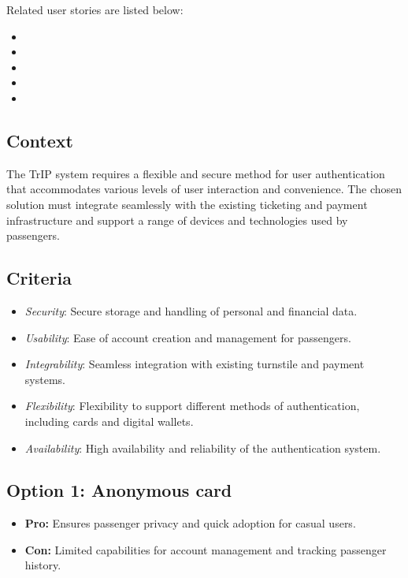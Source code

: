 Related user stories are listed below:
\begin{itemize}[noitemsep]
    \item \userStoryOne
    \item \userStoryFour
    \item \userStoryTwelve
    \item \userStoryEighteen
    \item \userStoryTwentySix
\end{itemize}

\subsection*{Context}
The TrIP system requires a flexible and secure method for user authentication that accommodates various levels of user interaction and convenience. The chosen solution must integrate seamlessly with the existing ticketing and payment infrastructure and support a range of devices and technologies used by passengers.

\subsection*{Criteria}
\begin{itemize}[noitemsep]
    \item \textit{Security}: Secure storage and handling of personal and financial data.
    \item \textit{Usability}: Ease of account creation and management for passengers.
    \item \textit{Integrability}: Seamless integration with existing turnstile and payment systems.
    \item \textit{Flexibility}: Flexibility to support different methods of authentication, including cards and digital wallets.
    \item \textit{Availability}: High availability and reliability of the authentication system.
\end{itemize}

\subsection*{Option 1: Anonymous card}
\begin{itemize}
    \item \textbf{Pro:} Ensures passenger privacy and quick adoption for casual users.
    \item \textbf{Con:} Limited capabilities for account management and tracking passenger history.
\end{itemize}

